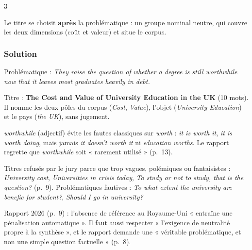 \documentclass[11pt,a4paper]{article}
\begin{document}
\begin{indication}{3}

Le titre se choisit \textbf{après} la problématique : un groupe nominal neutre, qui couvre les deux dimensions (coût et valeur) et situe le corpus.

\end{indication}

\hypertarget{solution-1}{%
\subsubsection{Solution}\label{solution-1}}

Problématique : \emph{They raise the question of whether a degree is still worthwhile now that it leaves most graduates heavily in debt.}

Titre : \textbf{The Cost and Value of University Education in the UK} (10 mots). Il nomme les deux pôles du corpus (\emph{Cost}, \emph{Value}), l'objet (\emph{University Education}) et le pays (\emph{the UK}), sans jugement.

\begin{methode}

\emph{worthwhile} (adjectif) évite les fautes classiques sur \emph{worth} : \emph{it is worth it}, \emph{it is worth doing}, mais jamais \emph{it doesn't worth it} ni \emph{education worths}. Le rapport regrette que \emph{worthwhile} soit « rarement utilisé » (p.~13).

\end{methode}

\begin{piege}

Titres refusés par le jury parce que trop vagues, polémiques ou fantaisistes : \emph{University cost}, \emph{Universities in crisis today}, \emph{To study or not to study, that is the question?} (p.~9). Problématiques fautives : \emph{To what extent the university are benefic for student?}, \emph{Should I go in university?}

\end{piege}

\begin{jury}

Rapport 2026 (p.~9) : l'absence de référence au Royaume-Uni « entraîne une pénalisation automatique ». Il faut aussi respecter « l'exigence de neutralité propre à la synthèse », et le rapport demande une « véritable problématique, et non une simple question factuelle » (p.~8).

\end{jury}
\end{document}
